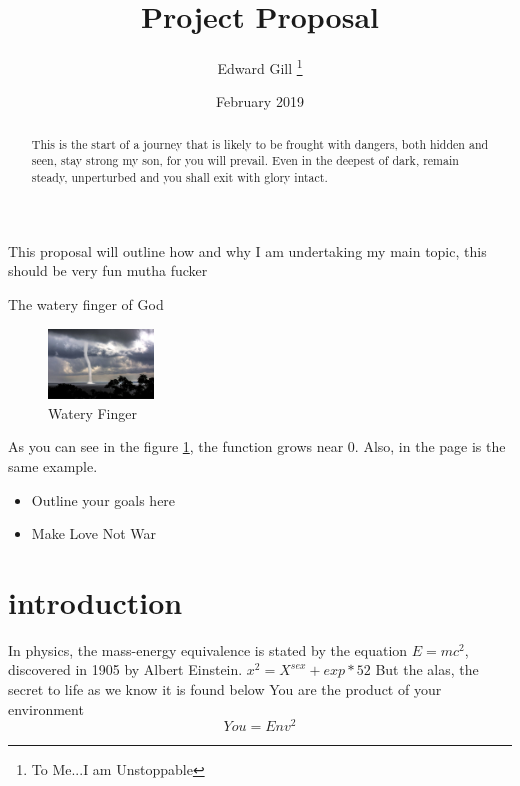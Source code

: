 \documentclass[12pt, a4paper]{article}
\title{Project Proposal}
\author{Edward Gill \thanks{To Me...I am Unstoppable}}
\date{February 2019}
\begin{document}
\maketitle

\begin{abstract}
This is the start of a journey that is likely to be frought with dangers, both hidden and seen, stay strong my son, for you will prevail. Even in the deepest of dark, remain steady, unperturbed and you shall exit with glory intact.
\end{abstract}
\tableofcontents
\clearpage
This proposal will outline how and why I am undertaking my main topic, this should be very fun mutha fucker

The watery finger of God 
\begin{figure}[h]
    \centering
    \includegraphics[width=0.25\textwidth]{uganda}
    \caption{Watery Finger}
    \label{fig:ass}
\end{figure}
 
As you can see in the figure \ref{fig:ass}, the 
function grows near 0. Also, in the page \pageref{fig:ass} 
is the same example.

\clearpage

\begin{itemize}
  \item Outline your goals here
  \item Make Love Not War
\end{itemize}

\clearpage

\section{introduction}

In physics, the mass-energy equivalence is stated 
by the equation $E=mc^2$, discovered in 1905 by Albert Einstein.
\begin{math}
x^2 = X^{sex}+ exp*52
\end{math}
But the alas, the secret to life as we know it is found below
You are the product of your environment
\begin{equation}
You = Env^2
\end{equation}
\end{document}
